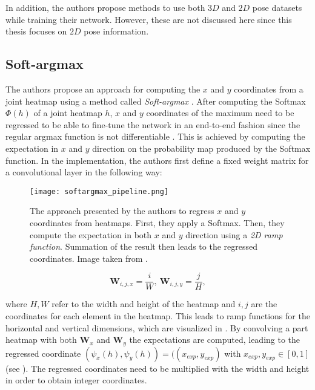 In addition, the authors propose methods to use both $3D$ and $2D$ pose datasets while training their network.
However, these are not discussed here since this thesis focuses on $2D$ pose information. 

\subsection{Soft-argmax}
\label{sec:softargmax}
The authors propose an approach for computing the $x$ and $y$ coordinates from a joint heatmap using a method called \textit{Soft-argmax} \cite{luvizon_human_2017}.
After computing the Softmax $\Phi(h)$ of a joint heatmap $h$, $x$ and $y$ coordinates of the maximum need to be regressed to be able to fine-tune the network in an end-to-end fashion since the regular argmax function is not differentiable \cite{luvizon_2d/3d_2018}.
This is achieved by computing the expectation in $x$ and $y$ direction on the probability map produced by the Softmax function.
In the implementation, the authors first define a fixed weight matrix for a convolutional layer in the following way:

\begin{figure}[htb!]
    \centering
    \texttt{[image: softargmax\_pipeline.png]}
    \caption{The approach presented by the authors to regress $x$ and $y$ coordinates from heatmaps. First, they apply a Softmax. Then, they compute the expectation in both $x$ and $y$ direction using a \textit{2D ramp function}. Summation of the result then leads to the regressed coordinates. Image taken from \cite{luvizon_2d/3d_2018}. }
    \label{fig:softargmax_pipeline}
\end{figure}

\begin{equation}
    \bm{W}_{i,j,x} = \frac{i}{W}, ~ \bm{W}_{i,j,y} = \frac{j}{H},
\end{equation}

where $H, W$ refer to the width and height of the heatmap and $i,j$ are the coordinates for each element in the heatmap.
This leads to ramp functions for the horizontal and vertical dimensions, which are visualized in .
By convolving a part heatmap with both $\bm{W}_x$ and $\bm{W}_y$ the expectations are computed, leading to the regressed coordinate $(\psi_x(h), \psi_y(h)) = ((x_{exp}, y_{exp})$ with $x_{exp}, y_{exp} \in [0,1]$ (see ).
The regressed coordinates need to be multiplied with the width and height in order to obtain integer coordinates.

